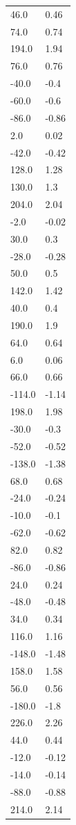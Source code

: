\begin{longtable}{ll}
46.0 & 0.46 \\
74.0 & 0.74 \\
194.0 & 1.94 \\
76.0 & 0.76 \\
-40.0 & -0.4 \\
-60.0 & -0.6 \\
-86.0 & -0.86 \\
2.0 & 0.02 \\
-42.0 & -0.42 \\
128.0 & 1.28 \\
130.0 & 1.3 \\
204.0 & 2.04 \\
-2.0 & -0.02 \\
30.0 & 0.3 \\
-28.0 & -0.28 \\
50.0 & 0.5 \\
142.0 & 1.42 \\
40.0 & 0.4 \\
190.0 & 1.9 \\
64.0 & 0.64 \\
6.0 & 0.06 \\
66.0 & 0.66 \\
-114.0 & -1.14 \\
198.0 & 1.98 \\
-30.0 & -0.3 \\
-52.0 & -0.52 \\
-138.0 & -1.38 \\
68.0 & 0.68 \\
-24.0 & -0.24 \\
-10.0 & -0.1 \\
-62.0 & -0.62 \\
82.0 & 0.82 \\
-86.0 & -0.86 \\
24.0 & 0.24 \\
-48.0 & -0.48 \\
34.0 & 0.34 \\
116.0 & 1.16 \\
-148.0 & -1.48 \\
158.0 & 1.58 \\
56.0 & 0.56 \\
-180.0 & -1.8 \\
226.0 & 2.26 \\
44.0 & 0.44 \\
-12.0 & -0.12 \\
-14.0 & -0.14 \\
-88.0 & -0.88 \\
214.0 & 2.14 \\

\end{longtable}
